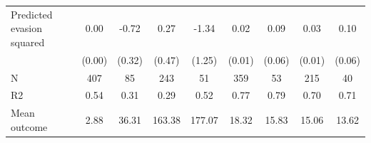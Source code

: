\begin{tabular}{lcccc|cccc}
\addlinespace
Predicted evasion squared&        0.00         &       -0.72\sym{**} &        0.27         &       -1.34         &        0.02         &        0.09         &        0.03\sym{**} &        0.10\sym{*}  \\
            &      (0.00)         &      (0.32)         &      (0.47)         &      (1.25)         &      (0.01)         &      (0.06)         &      (0.01)         &      (0.06)         \\
\midrule
N           &         407         &          85         &         243         &          51         &         359         &          53         &         215         &          40         \\
R2          &        0.54         &        0.31         &        0.29         &        0.52         &        0.77         &        0.79         &        0.70         &        0.71         \\
Mean outcome&        2.88         &       36.31         &      163.38         &      177.07         &       18.32         &       15.83         &       15.06         &       13.62         \\
\bottomrule \end{tabular}
